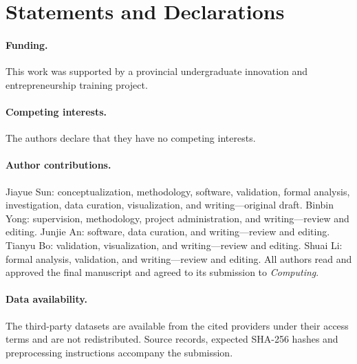 \documentclass[smallextended]{svjour3}
\begin{document}
\section*{Statements and Declarations}
\paragraph{Funding.} This work was supported by a provincial undergraduate innovation and entrepreneurship training project.
\paragraph{Competing interests.} The authors declare that they have no competing interests.
\paragraph{Author contributions.} Jiayue Sun: conceptualization, methodology, software, validation, formal analysis, investigation, data curation, visualization, and writing---original draft. Binbin Yong: supervision, methodology, project administration, and writing---review and editing. Junjie An: software, data curation, and writing---review and editing. Tianyu Bo: validation, visualization, and writing---review and editing. Shuai Li: formal analysis, validation, and writing---review and editing. All authors read and approved the final manuscript and agreed to its submission to \textit{Computing}.
\paragraph{Data availability.} The third-party datasets are available from the cited providers under their access terms and are not redistributed. Source records, expected SHA-256 hashes and preprocessing instructions accompany the submission.
\end{document}
